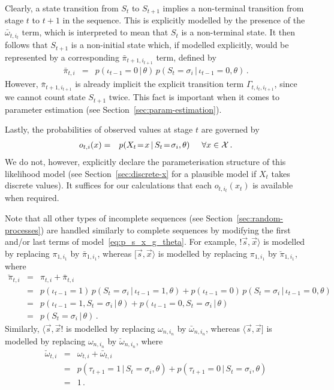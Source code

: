 \documentclass[a4paper]{article}
\begin{document}
Clearly, a state transition from $S_t$ to $S_{t+1}$ implies a non-terminal transition from stage $t$ to $t+1$ in the sequence. 
This is explicitly modelled by the presence of the $\bar{\omega}_{t,i_t}$ term,
which is interpreted to mean that $S_t$ is a non-terminal state.
It then follows that $S_{t+1}$ is a non-initial state which, if modelled explicitly, would be represented by a corresponding $\bar{\pi}_{t+1,i_{t+1}}$ term, defined by
\begin{eqnarray}
  \bar{\pi}_{t,i} & = & p(\iota_{t-1}\!=\!0\,|\,\theta)\,p(S_{t}\!=\!\sigma_{i}\,|\,\iota_{t-1}\!=\!0,\theta)\,.
\end{eqnarray}
However, $\bar{\pi}_{t+1,i_{t+1}}$ is already implicit the explicit transition term $\Gamma_{t,i_t,i_{t+1}}$,
since we cannot count state $S_{t+1}$ twice. This fact is important when it comes to parameter estimation (see Section~\ref{sec:param-estimation}).

Lastly, the probabilities of observed values at stage $t$ are governed by
\begin{eqnarray}
  o_{t,i}(x) & = & p(X_t\!=\!x\,|\,S_t\!=\!\sigma_{i},\theta) \hspace*{5mm}\forall x\in{\cal X}\,.
\end{eqnarray}
We do not, however, explicitly declare the parameterisation structure of this likelihood model (see Section~\ref{sec:discrete-x} for a plausible model if $X_t$ takes discrete values). 
It suffices for our calculations that each $o_{t,i_t}(x_t)$ is available when required.

Note that all other types of incomplete sequences (see Section~\ref{sec:random-processes}) are handled similarly to complete sequences by modifying the first and/or last terms of model~\eqref{eq:p_s_x_g_theta}.
For example, $!\vec{s},\vec{x}\rangle$ is modelled by replacing $\pi_{1,i_1}$ by $\bar{\pi}_{1,i_1}$, whereas $[\vec{s},\vec{x}\rangle$ is modelled by replacing $\pi_{1,i_1}$ by $\breve{\pi}_{1,i_1}$, where
\begin{eqnarray}
  \breve{\pi}_{t,i} & = & \pi_{t,i}+\bar{\pi}_{t,i}
\nonumber\\& = &
  p(\iota_{t-1}\!=\!1)\,p(S_t\!=\!\sigma_{i}\,|\,\iota_{t-1}\!=\!1,\theta)
+
  p(\iota_{t-1}\!=\!0)\,p(S_t\!=\!\sigma_{i}\,|\,\iota_{t-1}\!=\!0,\theta)
\nonumber\\& = &
  p(\iota_{t-1}\!=\!1,S_t\!=\!\sigma_{i}\,|\,\theta)
+
  p(\iota_{t-1}\!=\!0,S_t\!=\!\sigma_{i}\,|\,\theta)
\nonumber\\& = &
  p(S_t\!=\!\sigma_{i}\,|\,\theta)\,.
\end{eqnarray}
Similarly, $\langle\vec{s},\vec{x}!$ is modelled by replacing $\omega_{n,i_{n}}$ by $\bar{\omega}_{n,i_{n}}$, whereas $\langle\vec{s},\vec{x}]$ 
is modelled by replacing $\omega_{n,i_n}$ by $\breve{\omega}_{n,i_n}$, where
\begin{eqnarray}
   \breve{\omega}_{t,i} & = & \omega_{t,i}+\bar{\omega}_{t,i}
\nonumber\\& = &
   p(\tau_{t+1}\!=\!1\,|\,S_t\!=\!\sigma_i,\theta) + p(\tau_{t+1}\!=\!0\,|\,S_t\!=\!\sigma_i,\theta)
\nonumber\\& = &
  1\,.
\end{eqnarray}
\end{document}
